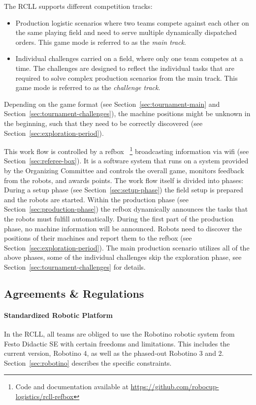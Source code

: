 \documentclass[12pt,twoside]{article}
\newcommand{\refsec}[1]{Section~\ref{#1}}
\begin{document}
The RCLL supports different competition tracks:
\begin{itemize}\itemsep0em
  \item Production logistic scenarios where two teams compete against
    each other on the same playing field and need to serve multiple dynamically
    dispatched orders. This game mode is referred to as the \emph{main track}.
  \item Individual challenges carried on a field, where only one team competes
   at a time.
   The challenges are designed to reflect the individual tasks that
   are required to solve complex production scenarios from the main track.
   This game mode is referred to as the \emph{challenge track}.
\end{itemize}
Depending on the game format
(see \refsec{sec:tournament-main} and \refsec{sec:tournament-challenges}),
the machine positions might be unknown in the beginning, such that they need
to be correctly discovered (see \refsec{sec:exploration-period}).

This work flow is controlled by a \acf{refbox}~\cite{RCI-RefBox}%
\footnote{Code and documentation available at
\url{https://github.com/robocup-logistics/rcll-refbox}}
broadcasting information via wifi (see \refsec{sec:referee-box}).
It is a software system that runs on a
system provided by the Organizing Committee and controls the overall game,
monitors feedback from the robots, and awards points.
The work flow itself is divided into phases:
During a setup phase (see \refsec{sec:setup-phase})
the field setup is prepared and the robots are started.
Within the production phase (see \refsec{sec:production-phase}) the
\ac{refbox} dynamically announces the tasks that the robots must fulfill
automatically. During the first part of the production phase, no machine
information will be announced.
Robots need to discover the positions of their machines and report
them to the \ac{refbox} (see \refsec{sec:exploration-period}).
The main production scenario utilizes all of the above phases, some of the
individual challenges skip the exploration phase, see
\refsec{sec:tournament-challenges} for details.

\subsection{Agreements \& Regulations}
\label{sec:agreements}
\paragraph{Standardized Robotic Platform}
In the \ac{RCLL}, all teams are obliged to use the Robotino robotic system
from Festo Didactic SE with certain freedoms and limitations. This
includes the current version, Robotino 4, as well as the phased-out
Robotino 3 and 2. \refsec{sec:robotino} describes the specific constraints.
\end{document}
